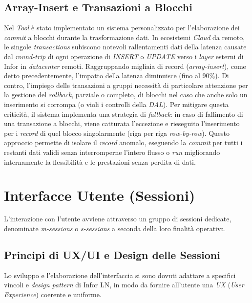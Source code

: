 \subsection{Array-Insert e Transazioni a Blocchi}\label{subsec:array-insert-e-transazioni-a-blocchi}
Nel \textit{Tool} è stato implementato un sistema personalizzato per l'elaborazione dei \textit{commit} a blocchi durante la trasformazione dati.
In ecosistemi \textit{Cloud} da remoto, le singole \textit{transactions} subiscono notevoli rallentamenti dati della latenza causate dal \textit{round-trip} 
di ogni operazione di \textit{INSERT} o \textit{UPDATE} verso i \textit{layer} esterni di Infor in \textit{datacenter} remoti.
Raggruppando migliaia di record (\textit{array-insert}), come detto precedentemente, l'impatto della latenza diminuisce (fino al 90\%).
Di contro, l'impiego delle transazioni a gruppi necessità di particolare attenzione per la gestione del \textit{rollback},
parziale o completo, di blocchi nel caso che anche solo un inserimento si corrompa (o violi i controlli della \textit{DAL}).
Per mitigare questa criticità, il sistema implementa una strategia di \textit{fallback}: in caso di fallimento di una transazione a blocchi,
viene catturata l'eccezione e rieseguito l'inserimento per i \textit{record} di quel blocco singolarmente (riga per riga \textit{row-by-row}).
Questo approccio permette di isolare il \textit{record} anomalo, eseguendo la \textit{commit} per tutti i restanti dati validi senza interromperne l'intero flusso o \textit{run}
migliorando internamente la flessibilità e le prestazioni senza perdita di dati.

\section{Interfacce Utente (Sessioni)}\label{sec:interfacce-utente-(sessioni)}
L'interazione con l'utente avviene attraverso un gruppo di sessioni dedicate, denominate \textit{m-sessions} o
\textit{s-sessions} a seconda della loro finalità operativa.

\subsection{Principi di UX/UI e Design delle Sessioni}\label{subsec:principi-di-ux/ui-e-design-delle-sessioni}
Lo sviluppo e l'elaborazione dell'interfaccia si sono dovuti adattare a specifici vincoli e \textit{design pattern} di
Infor LN, in modo da fornire all'utente una \textit{UX} (\textit{User Experience}) coerente e uniforme.

